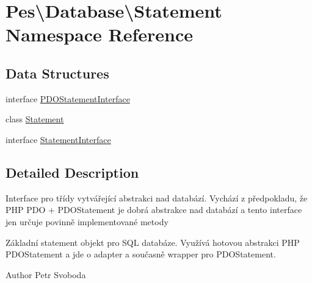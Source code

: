 \hypertarget{namespace_pes_1_1_database_1_1_statement}{}\section{Pes\textbackslash{}Database\textbackslash{}Statement Namespace Reference}
\label{namespace_pes_1_1_database_1_1_statement}
\subsection*{Data Structures}
\begin{DoxyCompactItemize}
\item 
interface \mbox{\hyperlink{interface_pes_1_1_database_1_1_statement_1_1_p_d_o_statement_interface}{P\+D\+O\+Statement\+Interface}}
\item 
class \mbox{\hyperlink{class_pes_1_1_database_1_1_statement_1_1_statement}{Statement}}
\item 
interface \mbox{\hyperlink{interface_pes_1_1_database_1_1_statement_1_1_statement_interface}{Statement\+Interface}}
\end{DoxyCompactItemize}


\subsection{Detailed Description}
Interface pro třídy vytvářející abstrakci nad databází. Vychází z předpokladu, že P\+HP P\+DO + P\+D\+O\+Statement je dobrá abstrakce nad databází a tento interface jen určuje povinně implementované metody

Základní statement objekt pro S\+QL databáze. Využívá hotovou abstrakci P\+HP P\+D\+O\+Statement a jde o adapter a současně wrapper pro P\+D\+O\+Statement.

\begin{DoxyAuthor}{Author}
Petr Svoboda 
\end{DoxyAuthor}
